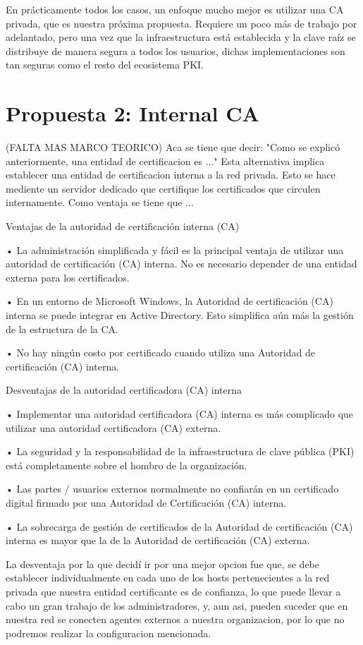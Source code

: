 En prácticamente todos los casos, un enfoque mucho mejor es utilizar una CA privada, 
que es nuestra próxima propuesta. Requiere un poco más de trabajo por adelantado, 
pero una vez que la infraestructura está establecida y la clave raíz se distribuye 
de manera segura a todos los usuarios, dichas implementaciones son tan seguras como 
el resto del ecosistema PKI.

\section{Propuesta 2: Internal CA}

(FALTA MAS MARCO TEORICO)
Aca se tiene que decir: "Como se explicó anteriormente, una entidad de certificacion es ..."
Esta alternativa implica establecer una entidad de certificacion interna a la red privada. Esto se hace 
mediente un servidor dedicado que certifique los certificados que circulen internamente.
Como ventaja se tiene que ... 

Ventajas de la autoridad de certificación interna (CA)

• La administración simplificada y fácil es la principal ventaja de utilizar una autoridad de 
certificación (CA) interna. No es necesario depender de una entidad externa para los certificados.

• En un entorno de Microsoft Windows, la Autoridad de certificación (CA) interna se puede 
integrar en Active Directory. Esto simplifica aún más la gestión de la estructura de la CA.

• No hay ningún costo por certificado cuando utiliza una Autoridad de certificación (CA) 
interna.

Desventajas de la autoridad certificadora (CA) interna

• Implementar una autoridad certificadora (CA) interna es más complicado que utilizar una 
autoridad certificadora (CA) externa.

• La seguridad y la responsabilidad de la infraestructura de clave pública (PKI) está 
completamente sobre el hombro de la organización.

• Las partes / usuarios externos normalmente no confiarán en un certificado digital 
firmado por una Autoridad de Certificación (CA) interna.

• La sobrecarga de gestión de certificados de la Autoridad de certificación (CA) interna es 
mayor que la de la Autoridad de certificación (CA) externa.

La desventaja por la que decidí ir por una mejor opcion fue que, se debe establecer 
individualmente en cada uno de los hosts pertenecientes a la red privada que nuestra entidad 
certificante es de confianza, lo que puede llevar a cabo un gran trabajo de los administradores, 
y, aun asi, pueden suceder que en nuestra red se conecten agentes externos a nuestra 
organizacion, por lo que no podremos realizar la configuracion mencionada.


